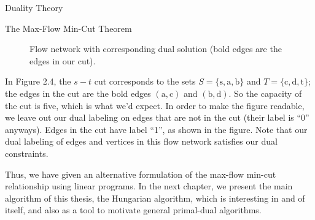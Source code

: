 \begin{section}{Duality Theory}
\begin{subsection}{The Max-Flow Min-Cut Theorem}
\begin{figure}[H]
		\caption{Flow network with corresponding dual solution (bold edges are the edges in our 
		cut).}
	\end{figure}
	In Figure 2.4, the $s-t$ cut corresponds to the sets $S= \{\mbox{s},\mbox{a},\mbox{b}\}$ and 
	$T = \{\mbox{c},\mbox{d},\mbox{t}\}$; the 
	edges in the cut are the bold edges $(\mbox{a},\mbox{c})$ and $(\mbox{b},\mbox{d})$. 
	So the capacity of the cut is five, 
	which is what we'd expect. In order to make the figure readable, we leave out our dual labeling 
	on edges that are not in the cut (their label is ``0'' anyways). Edges in the cut have label 
	``1'', as shown in the figure. Note that our dual labeling of edges and vertices in this flow 
	network satisfies our dual constraints.

	Thus, we have given an alternative formulation of the max-flow min-cut relationship using 
	linear programs. In the next chapter, we present the main algorithm of this thesis, the 
	Hungarian algorithm, which is interesting in and of itself, and also as a tool to motivate 
	general primal-dual algorithms.
\end{subsection}
\end{section}
